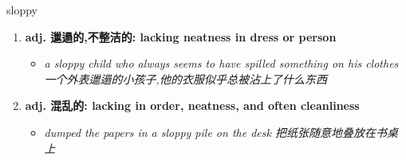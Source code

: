 
\begin{frame}
{\huge sloppy}
\begin{center}
\begin{enumerate}\Large
  \item \textbf{adj. 邋遢的,不整洁的: lacking neatness in dress or person}
  \begin{itemize}
    \item \em{\Large{a sloppy child who always seems to have spilled something on his clothes 一个外表邋遢的小孩子,他的衣服似乎总被沾上了什么东西}}
  \end{itemize}
  \item \textbf{adj. 混乱的: lacking in order, neatness, and often cleanliness}
  \begin{itemize}
    \item \em{\Large{dumped the papers in a sloppy pile on the desk 把纸张随意地叠放在书桌上}}
  \end{itemize}
\end{enumerate}
\end{center}
\end{frame}
